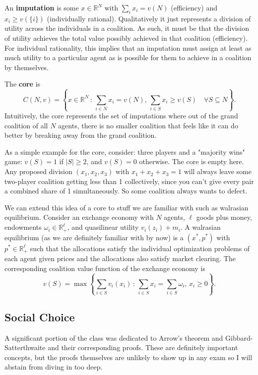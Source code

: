 \documentclass[11pt,english]{article}
\begin{document}
\begin{definition}
An \textbf{imputation} is some $x\in \mathbb{R}^N$ with $\sum_i x_i = v(N)$ (efficiency) and $x_i \geq v(\{i\})$ (individually rational). Qualitatively it just represents a division of utility across the individuals in a coalition. As such, it must be that the division of utility achieves the total value possibly achieved in that coalition (efficiency). For individual rationality, this implies that an imputation must assign at least as much utility to a particular agent as is possible for them to achieve in a coalition by themselves.

The \textbf{core} is $$C(N,v) = \left\{x\in \mathbb{R}^N\,:\, \sum_{i\in N}x_i = v(N),\,\sum_{i\in S}x_i \geq v(S)\quad \forall S\subseteq N\right\}.$$ Intuitively, the core represents the set of imputations where out of the grand coalition of all $N$ agents, there is no smaller coalition that feels like it can do better by breaking away from the grand coalition.
\end{definition}
As a simple example for the core, consider: three players and a "majority wins" game: $v(S)=1$ if $|S|\geq2$, and $v(S)=0$ otherwise. The core is empty here. Any proposed division $(x_1, x_2, x_3)$ with $x_1 + x_2 + x_3 = 1$ will always leave some two-player coalition getting less than 1 collectively, since you can't give every pair a combined share of 1 simultaneously. So some coalition always wants to defect.

We can extend this idea of a core to stuff we are familiar with such as walrasian equilibrium. Consider an exchange economy with $N$ agents, $\ell$ goods plus money, endowments $\omega_i\in \mathbb{R}_+^\ell$, and quasilinear utility $v_i(z_i) + m_i$. A walrasian equilibrium (as we are definitely familiar with by now) is a $(x^*, p^*)$ with $p^*\in \mathbb{R}_+^\ell$ such that the allocations satisfy the individual optimization problems of each agent given prices and the allocations also satisfy market clearing. The corresponding coalition value function of the exchange economy is $$v(S) = \max\left\{\sum_{i\in S}v_i(x_i)\,:\,\sum_{i\in S} x_i = \sum_{i\in S}\omega_i,\,x_i\geq 0\right\}.$$
\subsection{Social Choice}
A significant portion of the class was dedicated to Arrow's theorem and Gibbard-Satterthwaite and their corresponding proofs. These are definitely important concepts, but the proofs themselves are unlikely to show up in any exam so I will abstain from diving in too deep.
\end{document}
